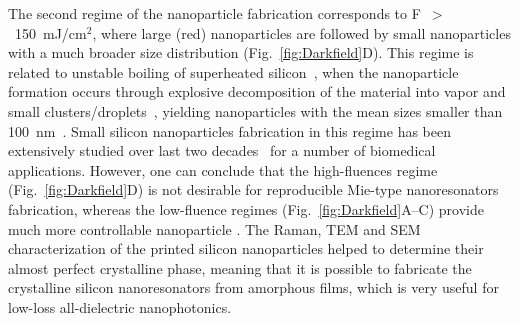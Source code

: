                 The second regime of the nanoparticle fabrication corresponds to F~$>$~150~mJ/cm$^{2}$, where large (red) nanoparticles
            are followed by small nanoparticles with a much broader size distribution (Fig.~\ref{fig:Darkfield}D). This regime is related to
            unstable boiling of superheated silicon~\cite{bulgakova2001pulsed, ionin2013thermal, wu2014microscopic}, when the
            nanoparticle formation occurs through explosive decomposition of the material into vapor and small
            clusters/droplets~\cite{itina2009molecular,wu2014microscopic}, yielding nanoparticles with the mean sizes smaller than
            100~nm~\cite{amoruso2004generation}. Small silicon nanoparticles fabrication in this regime has been extensively studied
            over last two decades~\cite{amoruso2004generation, tull2006formation} for a number of biomedical applications.
            However, one can conclude that the high-fluences regime (Fig.~\ref{fig:Darkfield}D) is not desirable for reproducible Mie-type
            nanoresonators fabrication, whereas the low-fluence regimes (Fig.~\ref{fig:Darkfield}A--C) provide much more controllable
            nanoparticle . The Raman, TEM and SEM characterization of the printed silicon nanoparticles
            helped to determine their almost perfect crystalline phase, meaning that it is possible to fabricate the crystalline
            silicon nanoresonators from amorphous films, which is very useful for low-loss all-dielectric nanophotonics.

    \subsection{}
        \label{sec:DarkfieldExp}


